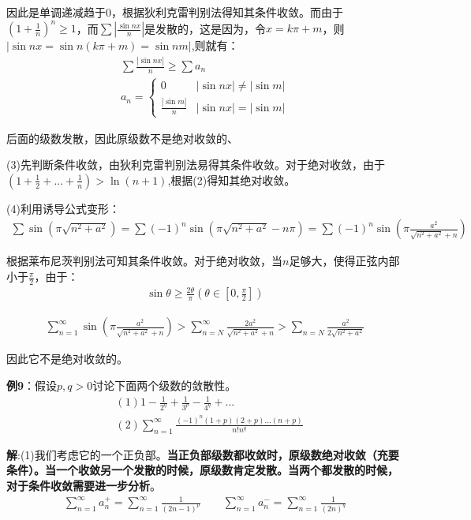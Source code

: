 \documentclass{ctexart}
\let\oldtextbf\textbf
\renewcommand{\textbf}[1]{\textcolor{brown!50!red}{\oldtextbf{#1}}}
\begin{document}
因此是单调递减趋于0，根据狄利克雷判别法得知其条件收敛。而由于$(1+\frac{1}{n})^n\geq 1$，而$\sum |\frac{\sin nx}{n}|$是发散的，这是因为，令$x=k\pi+m$，则$|\sin nx=\sin n(k\pi+m)=\sin nm|$,则就有：
\begin{align*} 
 \sum\frac{|\sin nx|}{n}\geq \sum a_n\\
a_n=\begin{cases}
0 & |\sin nx|\neq |\sin m|\\
\frac{|\sin m|}{n} &|\sin nx|=|\sin m|
\end{cases} 
\end{align*}

后面的级数发散，因此原级数不是绝对收敛的、

(3)先判断条件收敛，由狄利克雷判别法易得其条件收敛。对于绝对收敛，由于$(1+\frac{1}{2}+...+\frac{1}{n})>\ln(n+1)$,根据(2)得知其绝对收敛。

(4)利用诱导公式变形：
\begin{align*} 
 \sum\sin(\pi\sqrt{n^2+a^2})=\sum(-1)^n\sin(\pi\sqrt{n^2+a^2}-n\pi)=
\sum(-1)^n\sin(\pi\frac{a^2}{\sqrt{n^2+a^2}+n})
\end{align*}

根据莱布尼茨判别法可知其条件收敛。对于绝对收敛，当$n$足够大，使得正弦内部小于$\frac{\pi}{2}$，由于：
\begin{align*}
    \sin\theta\geq\frac{2\theta}{\pi}(\theta\in[0,\frac{\pi}{2}])
\end{align*}

\begin{align*} 
 \sum_{n=1}^\infty\sin(\pi\frac{a^2}{\sqrt{n^2+a^2}+n})>\sum_{n=N}^\infty\frac{2a^2}{\sqrt
{n^2+a^2} +n}>\sum_{n=N}\frac{a^2}{2\sqrt{n^2+a^2}}  
\end{align*}

因此它不是绝对收敛的。

\textbf{\color{brown!50!red}例9}：假设$p,q>0$讨论下面两个级数的敛散性。
\begin{align*}
    &(1)1-\frac{1}{2^q}+\frac{1}{3^p}-\frac{1}{4^q}+...\\
    &(2)\sum_{n=1}^\infty\frac{(-1)^n(1+p)(2+p)...(n+p)}{n!n^q}
\end{align*}

\textbf{\color{brown!50!red}解}:(1)我们考虑它的一个正负部。\textbf{\color{brown!50!red}当正负部级数都收敛时，原级数绝对收敛（充要条件）。当一个收敛另一个发散的时候，原级数肯定发散。当两个都发散的时候，对于条件收敛需要进一步分析}。
\begin{align*} 
 \sum_{n=1}^\infty a_n^+=\sum_{n=1}^\infty \frac{1}{(2n-1)^p}\qquad  
\sum_{n=1}^\infty a_n^-=\sum_{n=1}^\infty \frac{1}{(2n)^q}  
\end{align*}
\end{document}

